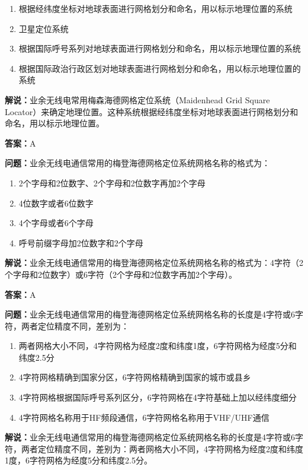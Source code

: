 \documentclass[UTF8]{ctexbook}
\begin{document}
\begin{enumerate}[label=\Alph*), leftmargin=3em]
  \item 根据经纬度坐标对地球表面进行网格划分和命名，用以标示地理位置的系统
  \item 卫星定位系统
  \item 根据国际呼号系列对地球表面进行网格划分和命名，用以标示地理位置的系统
  \item 根据国际政治行政区划对地球表面进行网格划分和命名，用以标示地理位置的系统
\end{enumerate}

\textbf{解说：}业余无线电常用梅森海德网格定位系统（Maidenhead Grid Square Locator）来确定地理位置。这种系统根据经纬度坐标对地球表面进行网格划分和命名，用以标示地理位置。

\textbf{答案：}A

\textbf{问题：}业余无线电通信常用的梅登海德网格定位系统网格名称的格式为：

\begin{enumerate}[label=\Alph*), leftmargin=3em]
  \item 2个字母和2位数字、2个字母和2位数字再加2个字母
  \item 4位数字或者6位数字
  \item 4个字母或者6个字母
  \item 呼号前缀字母加2位数字和2个字母
\end{enumerate}

\textbf{解说：}业余无线电通信常用的梅登海德网格定位系统网格名称的格式为：4字符（2个字母和2位数字）或6字符（2个字母和2位数字再加2个字母）。

\textbf{答案：}A

\textbf{问题：}业余无线电通信常用的梅登海德网格定位系统网格名称的长度是4字符或6字符，两者定位精度不同，差别为：

\begin{enumerate}[label=\Alph*), leftmargin=3em]
  \item 两者网格大小不同，4字符网格为经度2度和纬度1度，6字符网格为经度5分和纬度2.5分
  \item 4字符网格精确到国家分区，6字符网格精确到国家的城市或县乡
  \item 4字符网格根据国际呼号系列区分，6字符网格在4字符基础上加以经纬度细分
  \item 4字符网格名称用于HF频段通信，6字符网格名称用于VHF/UHF通信
\end{enumerate}

\textbf{解说：}业余无线电通信常用的梅登海德网格定位系统网格名称的长度是4字符或6字符，两者定位精度不同，差别为：两者网格大小不同，4字符网格为经度2度和纬度1度，6字符网格为经度5分和纬度2.5分。
\end{document}
